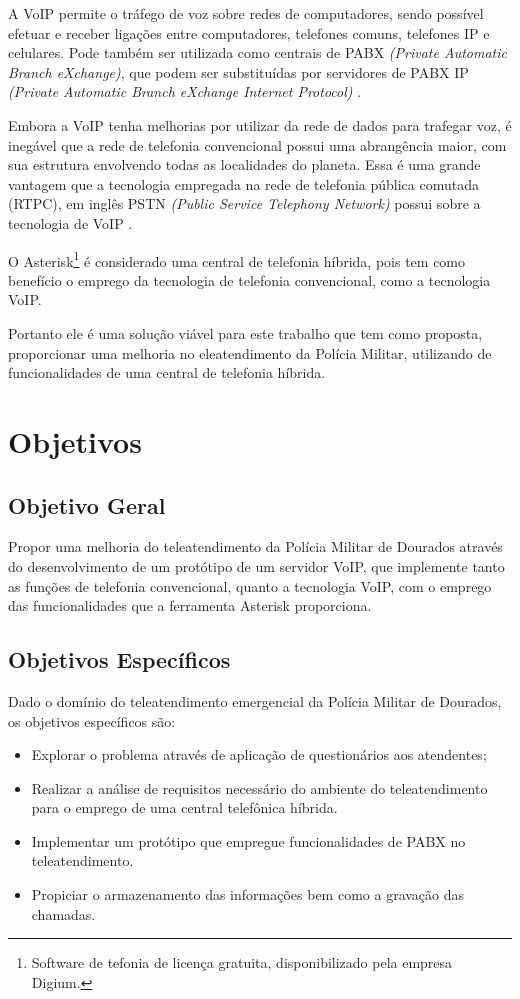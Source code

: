 A VoIP permite o tráfego de voz sobre redes de computadores, sendo possível efetuar e receber ligações entre computadores, telefones comuns, telefones IP e celulares. Pode também ser utilizada como centrais de PABX \textit{(Private Automatic Branch eXchange)}, que podem ser substituídas por servidores de PABX IP \textit{(Private Automatic Branch eXchange Internet Protocol)} \cite{glauciadasilvaribeiro2011}.

Embora a VoIP tenha melhorias por utilizar da rede de dados para trafegar voz, é inegável que a rede de telefonia convencional possui uma abrangência maior, com sua estrutura envolvendo todas as localidades do planeta. Essa é uma grande vantagem que a tecnologia empregada na rede de telefonia pública comutada (RTPC), em inglês PSTN \textit{(Public Service Telephony Network)} possui sobre a tecnologia de VoIP \cite{theodorewallingford2005}.

O Asterisk\footnote{Software de tefonia de licença gratuita, disponibilizado pela empresa Digium.} é considerado uma central de telefonia híbrida, pois tem como benefício o emprego da tecnologia de telefonia convencional, como a tecnologia VoIP.

Portanto ele é uma solução viável para este trabalho que tem como proposta, proporcionar uma melhoria no eleatendimento da Polícia Militar, utilizando de funcionalidades de uma central de telefonia híbrida.

\section{Objetivos}
\subsection{Objetivo Geral}
Propor uma melhoria do teleatendimento da Polícia Militar de Dourados através do desenvolvimento de um protótipo de um servidor VoIP, que implemente tanto as funções de telefonia convencional, quanto a tecnologia VoIP, com o emprego das funcionalidades que a ferramenta Asterisk proporciona.

\subsection{Objetivos Específicos}
Dado o domínio do teleatendimento emergencial da Polícia Militar de Dourados, os objetivos específicos são:

\begin{itemize}
	\item Explorar o problema através de aplicação de questionários aos atendentes;
	\item Realizar a análise de requisitos necessário do ambiente do teleatendimento para o emprego de uma central telefônica híbrida.
	\item Implementar um protótipo que empregue funcionalidades de PABX no teleatendimento.
	\item Propiciar o armazenamento das informações bem como a gravação das chamadas.
\end{itemize}

